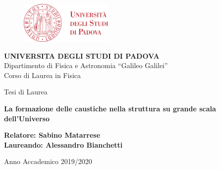 \begin{titlepage}
    \begin{center}

        \begin{figure}[H]
            \centering
            \includegraphics[width=0.4\textwidth]{unipd_logo.png}
        \end{figure}

        \vspace{0.5cm}

        \large
        \textbf{UNIVERSITA DEGLI STUDI DI PADOVA}\\
        Dipartimento di Fisica e Astronomia “Galileo Galilei”\\
        Corso di Laurea in Fisica\\

        \vspace{1cm}

        Tesi di Laurea
        \vspace*{1.5cm}

        \LARGE
        \textbf{La formazione delle caustiche nella struttura su grande scala dell'Universo}
        \vspace{1.5cm}

    \end{center}
    \vspace{6cm}
    \small
    \textbf{Relatore: Sabino Matarrese} \\
    \textbf{Laureando: Alessandro Bianchetti}
    \vspace{2cm}

    \LARGE
    \begin{center}
        Anno Accademico 2019/2020
    \end{center}

    

    
\end{titlepage}